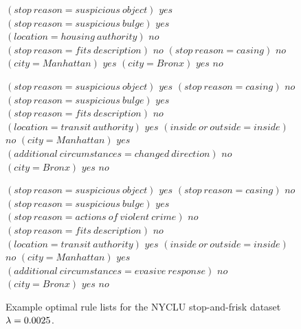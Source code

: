 \begin{figure}[h!]
\begin{algorithmic}
\State \belif $(stop~reason = suspicious~object)$ \bthen $yes$
\State \belif $(stop~reason = suspicious~bulge)$ \bthen $yes$
\State \belif $(location = housing~authority)$ \bthen $no$
\State \belif $(stop~reason = fits~description)$ \bthen $no$
\State \belif $(stop~reason = casing)$ \bthen $no$
\State \belif $(city = Manhattan)$ \bthen $yes$
\State \belif $(city = Bronx)$ \bthen $yes$
\State \belse $no$
\end{algorithmic}
\vspace{0.5mm}
\begin{algorithmic}
\State \bif $(stop~reason = suspicious~object)$ \bthen $yes$ 
\State \belif $(stop~reason = casing)$ \bthen $no$
\State \belif $(stop~reason = suspicious~bulge)$ \bthen $yes$
\State \belif $(stop~reason = fits~description)$ \bthen $no$
\State \belif $(location = transit~authority)$ \bthen $yes$
\State \belif $(inside~or~outside = inside)$ \bthen $no$
\State \belif $(city = Manhattan)$ \bthen $yes$
\State \belif $(additional~circumstances = changed~direction)$ \bthen $no$
\State \belif $(city = Bronx)$ \bthen $yes$
\State \belse $no$
\end{algorithmic}
\vspace{0.5mm}
\begin{algorithmic}
\State \bif $(stop~reason = suspicious~object)$ \bthen $yes$ 
\State \belif $(stop~reason = casing)$ \bthen $no$
\State \belif $(stop~reason = suspicious~bulge)$ \bthen $yes$
\State \belif $(stop~reason = actions~of~violent~crime)$ \bthen $no$
\State \belif $(stop~reason = fits~description)$ \bthen $no$
\State \belif $(location = transit~authority)$ \bthen $yes$
\State \belif $(inside~or~outside = inside)$ \bthen $no$
\State \belif $(city = Manhattan)$ \bthen $yes$
\State \belif $(additional~circumstances = evasive~response)$ \bthen $no$
\State \belif $(city = Bronx)$ \bthen $yes$
\State \belse $no$
\end{algorithmic}
\caption{Example optimal rule lists for the NYCLU stop-and-frisk dataset~${{\lambda} = 0.0025}$.
}
\label{fig:weapon-rule-list-0025}
\end{figure}

